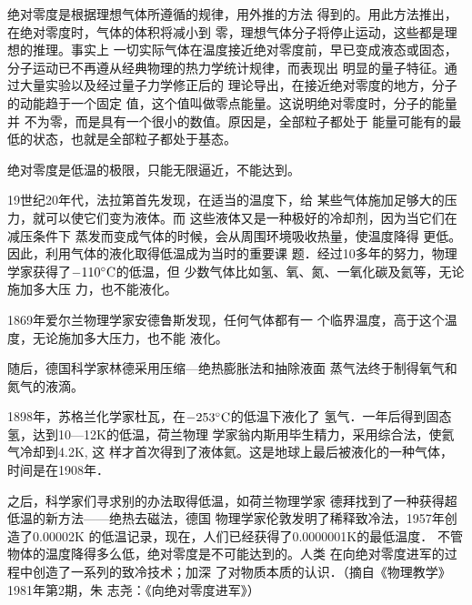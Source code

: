 绝对零度是根据理想气体所遵循的规律，用外推的方法
得到的。用此方法推出，在绝对零度时，气体的体积将减小到
零，理想气体分子将停止运动，这些都是理想的推理。事实上
一切实际气体在温度接近绝对零度前，早已变成液态或固态，
分子运动已不再遵从经典物理的热力学统计规律，而表现出
明显的量子特征。通过大量实验以及经过量子力学修正后的
理论导出，在接近绝对零度的地方，分子的动能趋于一个固定
值，这个值叫做零点能量。这说明绝对零度时，分子的能量并
不为零，而是具有一个很小的数值。原因是，全部粒子都处于
能量可能有的最低的状态，也就是全部粒子都处于基态。

绝对零度是低温的极限，只能无限逼近，不能达到。

19世纪20年代，法拉第首先发现，在适当的温度下，给
某些气体施加足够大的压力，就可以使它们变为液体。而
这些液体又是一种极好的冷却剂，因为当它们在减压条件下
蒸发而变成气体的时候，会从周围环境吸收热量，使温度降得
更低。因此，利用气体的液化取得低温成为当时的重要课
题．经过10多年的努力，物理学家获得了$-110^{\circ}{\rm C}$的低温，但
少数气体比如氢、氧、氮、一氧化碳及氦等，无论施加多大压
力，也不能液化。

1869年爱尔兰物理学家安德鲁斯发现，任何气体都有一
个临界温度，高于这个温度，无论施加多大压力，也不能
液化。

随后，德国科学家林德采用压缩—绝热膨胀法和抽除液面
蒸气法终于制得氧气和氮气的液滴。

1898年，苏格兰化学家杜瓦，在$-253^{\circ}{\rm C}$的低温下液化了
氢气．一年后得到固态氢，达到10—12K的低温，荷兰物理
学家翁内斯用毕生精力，采用综合法，使氦气冷却到4.2K, 这
样才首次得到了液体氦。这是地球上最后被液化的一种气体，
时间是在1908年．

之后，科学家们寻求别的办法取得低温，如荷兰物理学家
德拜找到了一种获得超低温的新方法——绝热去磁法，德国
物理学家伦敦发明了稀释致冷法，1957年创造了0.00002K
的低温记录，现在，人们已经获得了0.0000001K的最低温度．
不管物体的温度降得多么低，绝对零度是不可能达到的。人类
在向绝对零度进军的过程中创造了一系列的致冷技术；加深
了对物质本质的认识．（摘自《物理教学》1981年第2期，朱
志尧：《向绝对零度进军》）





